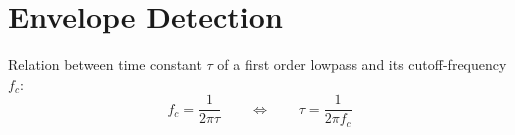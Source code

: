 \section{Envelope Detection}

Relation between time constant $\tau$ of a first order lowpass and its cutoff-frequency $f_c$:
\begin{equation}
 f_c = \frac{1}{2 \pi \tau} \qquad \Leftrightarrow \qquad \tau = \frac{1}{2 \pi f_c}
\end{equation}